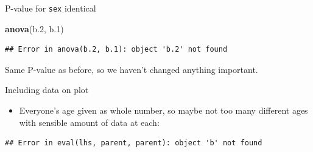\documentclass[ignorenonframetext,]{beamer}
\newenvironment{Shaded}{\begin{snugshade}}{\end{snugshade}}
\newcommand{\DataTypeTok}[1]{\textcolor[rgb]{0.13,0.29,0.53}{#1}}
\newcommand{\FloatTok}[1]{\textcolor[rgb]{0.00,0.00,0.81}{#1}}
\newcommand{\KeywordTok}[1]{\textcolor[rgb]{0.13,0.29,0.53}{\textbf{#1}}}
\newcommand{\NormalTok}[1]{#1}
\newcommand{\OperatorTok}[1]{\textcolor[rgb]{0.81,0.36,0.00}{\textbf{#1}}}
\newcommand{\StringTok}[1]{\textcolor[rgb]{0.31,0.60,0.02}{#1}}
\providecommand{\tightlist}{%
  \setlength{\itemsep}{0pt}\setlength{\parskip}{0pt}}
\begin{document}
\begin{frame}[fragile]{P-value for \texttt{sex} identical}
\protect\hypertarget{p-value-for-sex-identical}{}

\footnotesize

\begin{Shaded}
\begin{Highlighting}[]
\KeywordTok{anova}\NormalTok{(b}\FloatTok{.2}\NormalTok{, b}\FloatTok{.1}\NormalTok{)}
\end{Highlighting}
\end{Shaded}

\begin{verbatim}
## Error in anova(b.2, b.1): object 'b.2' not found
\end{verbatim}

\normalsize

Same P-value as before, so we haven't changed anything important.

\end{frame}

\begin{frame}[fragile]{Including data on plot}
\protect\hypertarget{including-data-on-plot}{}

\begin{itemize}
\tightlist
\item
  Everyone's age given as whole number, so maybe not too many different
  ages with sensible amount of data at each:
\end{itemize}

\scriptsize

\begin{Shaded}
\end{Shaded}

\begin{verbatim}
## Error in eval(lhs, parent, parent): object 'b' not found
\end{verbatim}

\normalsize

\end{frame}
\end{document}
